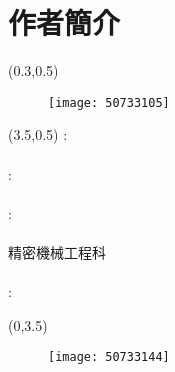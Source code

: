 \chapter{作者簡介}
	{\begin{textblock}{6}(0.3,0.5)
	\begin{figure}
	\texttt{[image: 50733105]} 
	\end{figure}
	\end{textblock}}
	{\renewcommand\baselinestretch{0.99}\selectfont %
	{\begin{textblock}{15}(3.5,0.5)%
	\noindent\fontsize{16pt}{0em}\selectfont {}\enspace:\enspace
    \fontsize{16pt}{0em}\selectfont {}\\ \hspace*{\fill} \\[0.5em]
    \fontsize{16pt}{0em}\selectfont {}\enspace:\enspace
    \fontsize{16pt}{0em}\selectfont {} \\ %
    \hspace*{\fill} \\[0.5em]
    \fontsize{16pt}{0em}\selectfont {}\enspace:\enspace
    \fontsize{16pt}{0em}\selectfont {}\\ \hspace*{\fill} \\[0.5em]
    \fontsize{16pt}{0em}\selectfont \makebox[4em][s]{} \hspace{0.5em}
    \hspace{0.25em}精密機械工程科\\
    \hspace{0.5em} \\[0.5em]
    \fontsize{16pt}{0em}\selectfont {}\enspace:\enspace
    \end{textblock}}}
    {\begin{textblock}{6}(0,3.5)
	\begin{figure}
	\texttt{[image: 50733144]} 
	\end{figure}
	\end{textblock}}
